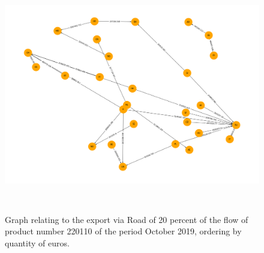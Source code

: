 \documentclass[a4paper,12pt]{article} %
\begin{document}
\begin{figure}[H]
	\includegraphics[height=10.3cm, width=14cm]{graph}
	\caption{Graph relating to the export via Road of 20 percent of the flow of product number 220110 of the period October 2019, ordering by quantity of euros.}   
 	 \label{fig:picture}
\end{figure}
\end{document}
